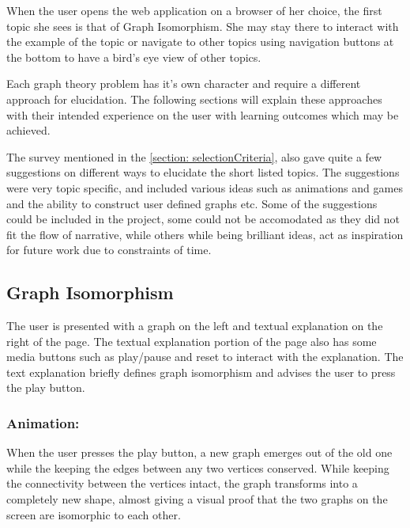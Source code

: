 When the user opens the web application on a browser of her choice, the first
topic she sees is that of Graph Isomorphism. She may stay there to interact
with the example of the topic or navigate to other topics using navigation
buttons at the bottom to have a bird's eye view of other topics.

Each graph theory problem has it's own character and require a different
approach for elucidation. The following sections will explain these approaches
with their intended experience on the user with learning outcomes which may be
achieved.

The survey mentioned in the \autoref{section: selectionCriteria}, also gave
quite a few suggestions on different ways to elucidate the short listed topics.
The suggestions were very topic specific, and included various ideas such as
animations and games and the ability to construct user defined graphs etc. Some
of the suggestions could be included in the project, some could not be
accomodated as they did not fit the flow of narrative, while others while being
brilliant ideas, act as inspiration for future work due to constraints of time.

\subsection{Graph Isomorphism}
\label{story: isomorphism}
The user is presented with a graph on the left and textual explanation on the
right of the page.  The textual explanation portion of the page also has some
media buttons such as play/pause and reset to interact with the explanation.
The text explanation briefly defines graph isomorphism and advises the user to
press the play button.

\subsubsection{Animation:}
When the user presses the play button, a new graph emerges out of the old one
while the keeping the edges between any two vertices conserved. While keeping
the connectivity between the vertices intact, the graph transforms into a
completely new shape, almost giving a visual proof that the two graphs on the
screen are isomorphic to each other.

